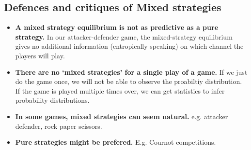 \subsection*{Defences and critiques of Mixed strategies}
\begin{itemize}
    \item \textbf{A mixed strategy equilibrium is not as predictive as a pure strategy.} In our attacker-defender game, the mixed-strategy equilibrium gives no additional information (entropically speaking) on which channel the players will play. 
    \item \textbf{There are no `mixed strategies' for a single play of a game.} If we just do the game once, we will not be able to observe the proabiltiy distribution. If the game is played multiple times over, we can get statistics to infer probability distributions. 
    \item \textbf{In some games, mixed strategies can seem natural.} e.g. attacker defender, rock paper scissors. 
    \item \textbf{Pure strategies might be prefered.} E.g. Cournot competitions.
\end{itemize}